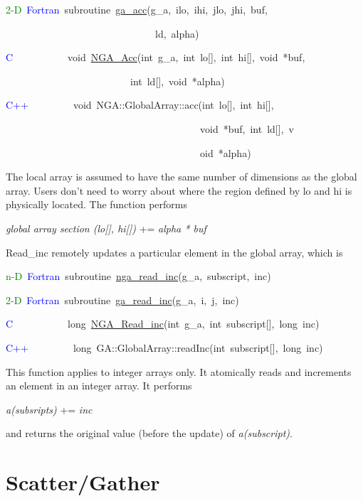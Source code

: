 \textcolor{green}{2-D}~\textcolor{blue}{Fortran}~subroutine~\href{https://hpc.pnl.gov/globalarrays/api/f_op_api.html\#ga_acc}{ga\_{}acc}(g\_a,~ilo,~ihi,~jlo,~jhi,~buf,~

~~~~~~~~~~~~~~~~~~~~~~~~~~~~~~ld,~alpha)~

\textcolor{blue}{C}~~~~~~~~~~~void~\href{https://hpc.pnl.gov/globalarrays/api/c_op_api.html\#ga_acc}{NGA\_{}Acc}(int~g\_a,~int~lo{[}{]},~int~hi{[}{]},~void~{*}buf,~

~~~~~~~~~~~~~~~~~~~~~~~~~int~ld{[}{]},~void~{*}alpha)~

\textcolor{blue}{C++}~~~~~~~~~void~NGA::GlobalArray::acc(int~lo{[}{]},~int~hi{[}{]},~

~~~~~~~~~~~~~~~~~~~~~~~~~~~~~~~~~~~~~~~void~{*}buf,~int~ld{[}{]},~v

~~~~~~~~~~~~~~~~~~~~~~~~~~~~~~~~~~~~~~~oid~{*}alpha)

The local array is assumed to have the same number of dimensions as
the global array. Users don't need to worry about where the region
defined by lo and hi is physically located. The function performs

\emph{global array section (lo{[}{]}, hi{[}{]})} += \emph{alpha {*}
buf}

Read\_inc remotely updates a particular element in the global array,
which is

\textcolor{green}{n-D}~\textcolor{blue}{Fortran}~subroutine~\href{https://hpc.pnl.gov/globalarrays/api/f_op_api.html\#ga_read_inc}{nga\_{}read\_{}inc}(g\_a,~subscript,~inc)~

\textcolor{green}{2-D}~\textcolor{blue}{Fortran}~subroutine~\href{https://hpc.pnl.gov/globalarrays/api/f_op_api.html\#ga_read_inc}{ga\_{}read\_{}inc}(g\_a,~i,~j,~inc)~

\textcolor{blue}{C}~~~~~~~~~~~long~\href{https://hpc.pnl.gov/globalarrays/api/c_op_api.html\#ga_read_inc}{NGA\_{}Read\_{}inc}(int~g\_a,~int~subscript{[}{]},~long~inc)~

\textcolor{blue}{C++}~~~~~~~~~long~GA::GlobalArray::readInc(int~subscript{[}{]},~long~inc)

This function applies to integer arrays only. It atomically reads
and increments an element in an integer array. It performs

\emph{a(subsripts)} += \emph{inc}

and returns the original value (before the update) of \emph{a(subscript)}. 


\section{Scatter/Gather }

